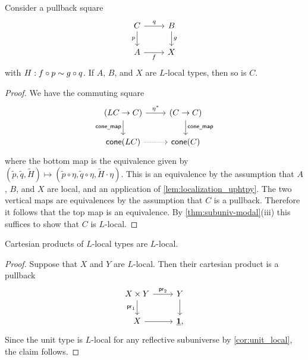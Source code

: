 \begin{prp}\label{prp:local_pb}
Consider a pullback square
\begin{equation*}
\begin{tikzcd}
C \arrow[d,swap,"p"] \arrow[r,"q"] & B \arrow[d,"g"] \\
A \arrow[r,swap,"f"] & X
\end{tikzcd}
\end{equation*}
with $H:f\circ p\sim g\circ q$. If $A$, $B$, and $X$ are $L$-local types, then so is $C$. 
\end{prp}

\begin{proof}
We have the commuting square
\begin{equation*}
\begin{tikzcd}
(LC\to C) \arrow[d,swap,"\mathsf{cone\usc{}map}"] \arrow[r,"\precomp{\modalunit}"] & (C\to C) \arrow[d,"\mathsf{cone\usc{}map}"] \\
\mathsf{cone}(LC) \arrow[r,densely dotted] & \mathsf{cone}(C)
\end{tikzcd}
\end{equation*}
where the bottom map is the equivalence given by $(\tilde{p},\tilde{q},\tilde{H})\mapsto (\tilde{p}\circ\eta,\tilde{q}\circ\eta,\tilde{H}\cdot \eta)$. This is an equivalence by the assumption that $A$, $B$, and $X$ are local, and an application of \cref{lem:localization_uphtpy}. The two vertical maps are equivalences by the assumption that $C$ is a pullback. Therefore it follows that the top map is an equivalence. By \cref{thm:subuniv-modal}(iii) this suffices to show that $C$ is $L$-local.
\end{proof}

\begin{cor}\label{cor:local_prod}
Cartesian products of $L$-local types are $L$-local.
\end{cor}

\begin{proof}
Suppose that $X$ and $Y$ are $L$-local. Then their cartesian product is a pullback
\begin{equation*}
\begin{tikzcd}
X\times Y \arrow[d,swap,"\proj 1"] \arrow[r,"\proj 2"] & Y \arrow[d] \\
X \arrow[r] & \unit,
\end{tikzcd}
\end{equation*}
Since the unit type is $L$-local for any reflective subuniverse by \cref{cor:unit_local}, the claim follows.
\end{proof}

